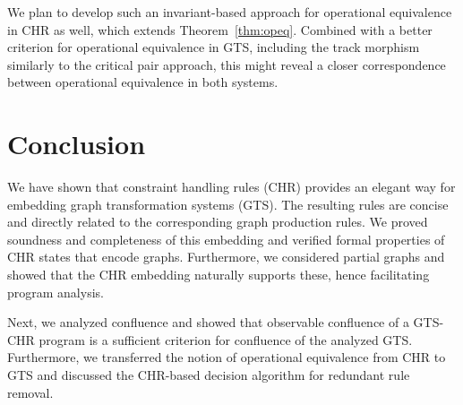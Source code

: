 \documentclass{tlp}
\begin{document}
We plan to develop such an invariant-based approach for operational equivalence
in CHR as well, which extends Theorem~\ref{thm:opeq}. Combined with a better
criterion for operational equivalence in GTS, including the track morphism
similarly to the critical pair approach, this might reveal a closer
correspondence between operational equivalence in both systems.

\section{Conclusion}
\label{sec:conclusion}

We have shown that constraint handling rules (CHR) provides an elegant way for
embedding graph transformation systems (GTS). The resulting rules are concise and
directly related to the corresponding graph production rules. We proved soundness
and completeness of this embedding and verified formal properties of CHR states
that encode graphs. Furthermore, we considered partial graphs and showed that the
CHR embedding naturally supports these, hence facilitating program analysis.

Next, we analyzed confluence and showed that observable confluence of a GTS-CHR
program is a sufficient criterion for confluence of the analyzed GTS.
Furthermore, we transferred the notion of operational equivalence from CHR to GTS
and discussed the CHR-based decision algorithm for redundant rule removal.


\end{document}
